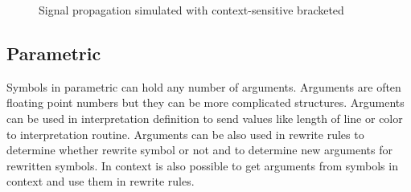 \begin{figure}[ht]
	\centering
	\hfill
	\caption{Signal propagation simulated with context-sensitive bracketed \lsystems}
	\label{fig:signalPropagation}
\end{figure}


\subsection{Parametric \lsystems}

Symbols in parametric \lsystems can hold any number of arguments.
Arguments are often floating point numbers but they can be more complicated structures.
Arguments can be used in interpretation definition to send values like length of line or color to interpretation routine.
Arguments can be also used in rewrite rules to determine whether rewrite symbol or not and to determine new arguments for rewritten symbols.
In context \twolsystems is also possible to get arguments from symbols in context and use them in rewrite rules.



































